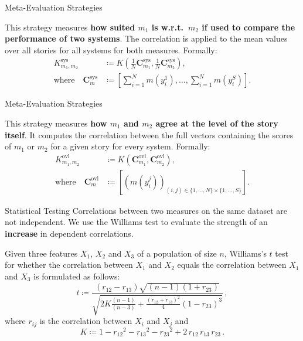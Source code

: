 \begin{frame}{Meta-Evaluation Strategies}
    \begin{definition}
        This strategy measures \textbf{how suited $m_1$ is w.r.t.\ $m_2$ if used to compare the performance of two systems}. The correlation is applied to the mean values over all stories for all systems for both measures. Formally:
        \begin{align}
        K^{\textrm{sys}}_{m_1,m_2} & \coloneqq K \left(\frac{1}{N} \mathbf{C}^{\textrm{sys}}_{m_1},\frac{1}{N} \mathbf{C}^{\textrm{sys}}_{m_2} \right),\\
        \text{where} \quad \mathbf{C}^{\textrm{sys}}_{m} & \coloneqq \left[ \sum\limits_{i=1}^N m\left(y_i^1\right),\dots, \sum\limits_{i=1}^N m\left(y_i^S\right)\right].\nonumber
        \end{align}
    \end{definition}
\end{frame}

\begin{frame}{Meta-Evaluation Strategies}
    \begin{definition}
        This strategy measures \textbf{how $m_1$ and $m_2$ agree at the level of the story itself}. It computes the correlation between the full vectors containing the scores of $m_1$ or $m_2$ for a given story for every system. Formally:
        \begin{align}
        K^{\textrm{ovl}}_{m_1,m_2} & \coloneqq K \left( \mathbf{C}^{\textrm{ovl}}_{m_1},\mathbf{C}^{\textrm{ovl}}_{m_2} \right),\\
        \text{where} \quad \mathbf{C}^{\textrm{ovl}}_{m} & \coloneqq \left[\left(m\left(y_i^j\right)\right)_{(i,j) \in \{1, \dots, N\} \times \{1, \dots, S\}}\right].\nonumber
        \end{align}
    \end{definition}
\end{frame}

\begin{frame}{Statistical Testing}
    Correlations between two measures on the same dataset are not independent. We use the Williams test to evaluate the strength of an \textbf{increase} in dependent correlations.
    \begin{definition}
        Given three features $X_1$, $X_2$ and $X_3$ of a population of size $n$, Williams's $t$ test for whether the correlation between $X_1$ and $X_2$ equals the correlation between $X_1$ and $X_3$ is formulated as follows:
        \[ t \coloneqq \frac{(r_{12} - r_{13}) \sqrt{(n-1)(1+r_{23})}}{\sqrt{2K \frac{(n-1)}{(n-3)} + \frac{(r_{12} + r_{13})^2}{4} (1 - r_{23})^3}} \, , \]
        where $r_{ij}$ is the correlation between $X_i$ and $X_j$ and
        \[ K \coloneqq 1 - {r_{12}}^2 - {r_{13}}^2 - {r_{23}}^2 + 2 \, r_{12} \, r_{13} \, r_{23} \, . \]
    \end{definition}
\end{frame}

